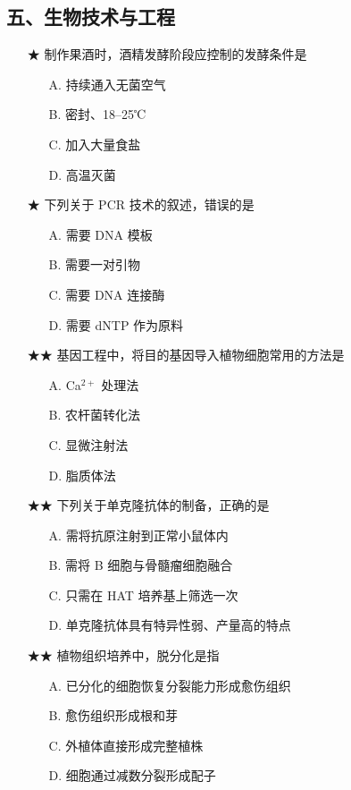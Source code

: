 \subsection{五、生物技术与工程}

\begin{enumerate}
  \item[★] 制作果酒时，酒精发酵阶段应控制的发酵条件是
  \begin{enumerate}
    \item[A.] 持续通入无菌空气
    \item[B.] 密封、18--25℃
    \item[C.] 加入大量食盐
    \item[D.] 高温灭菌
  \end{enumerate}
  \vspace{0.8cm}

  \item[★] 下列关于 PCR 技术的叙述，错误的是
  \begin{enumerate}
    \item[A.] 需要 DNA 模板
    \item[B.] 需要一对引物
    \item[C.] 需要 DNA 连接酶
    \item[D.] 需要 dNTP 作为原料
  \end{enumerate}
  \vspace{0.8cm}

  \item[★★] 基因工程中，将目的基因导入植物细胞常用的方法是
  \begin{enumerate}
    \item[A.] Ca$^{2+}$ 处理法
    \item[B.] 农杆菌转化法
    \item[C.] 显微注射法
    \item[D.] 脂质体法
  \end{enumerate}
  \vspace{0.8cm}

  \item[★★] 下列关于单克隆抗体的制备，正确的是
  \begin{enumerate}
    \item[A.] 需将抗原注射到正常小鼠体内
    \item[B.] 需将 B 细胞与骨髓瘤细胞融合
    \item[C.] 只需在 HAT 培养基上筛选一次
    \item[D.] 单克隆抗体具有特异性弱、产量高的特点
  \end{enumerate}
  \vspace{0.8cm}

  \item[★★] 植物组织培养中，脱分化是指
  \begin{enumerate}
    \item[A.] 已分化的细胞恢复分裂能力形成愈伤组织
    \item[B.] 愈伤组织形成根和芽
    \item[C.] 外植体直接形成完整植株
    \item[D.] 细胞通过减数分裂形成配子
  \end{enumerate}
  \vspace{1cm}
\end{enumerate}

